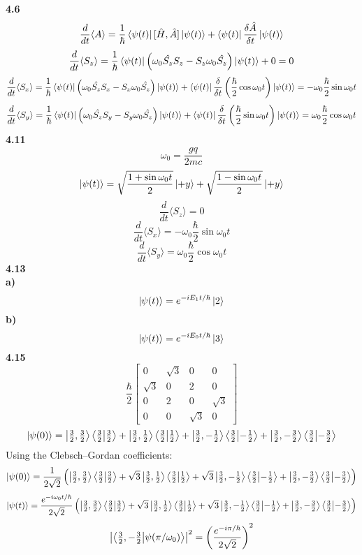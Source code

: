 \documentclass[english]{article}
\begin{document}
\noindent
\textbf{4.6}\\
$$\frac{d}{dt}\langle A\rangle=\frac{1}{\hbar}\bra{\psi(t)}[\hat{H},\hat{A}]\ket{\psi(t)}+\bra{\psi(t)}\frac{\delta\hat{A}}{\delta t}\ket{\psi(t)}$$
$$\frac{d}{dt}\langle S_z\rangle=\frac{1}{\hbar}\bra{\psi(t)}\left(\omega_0\hat{S_z}S_z-S_z\omega_0\hat{S_z}\right)\ket{\psi(t)}+0=0$$
$$\frac{d}{dt}\langle S_x\rangle=\frac{1}{\hbar}\bra{\psi(t)}\left(\omega_0\hat{S_z}S_x-S_x\omega_0\hat{S_z}\right)\ket{\psi(t)}+\bra{\psi(t)}\frac{\delta}{\delta t}\left(\frac{\hbar}{2}\cos\omega_0t\right)\ket{\psi(t)}=-\omega_0\frac{\hbar}{2}\sin\omega_0t$$
$$\frac{d}{dt}\langle S_y\rangle=\frac{1}{\hbar}\bra{\psi(t)}\left(\omega_0\hat{S_z}S_y-S_y\omega_0\hat{S_z}\right)\ket{\psi(t)}+\bra{\psi(t)}\frac{\delta}{\delta t}\left(\frac{\hbar}{2}\sin\omega_0t\right)\ket{\psi(t)}=\omega_0\frac{\hbar}{2}\cos\omega_0t$$
\noindent
\textbf{4.11}\\
$$\omega_0=\frac{gq}{2mc}$$
$$\ket{\psi(t)}=\sqrt{\frac{1+\sin\omega_0t}{2}}\ket{+y}+\sqrt{\frac{1-\sin\omega_0t}{2}}\ket{+y}$$
$$\frac{d}{dt}\langle S_z\rangle=0$$
$$\frac{d}{dt}\langle S_x\rangle=-\omega_0\frac{\hbar}{2}\sin\omega_0t$$
$$\frac{d}{dt}\langle S_y\rangle=\omega_0\frac{\hbar}{2}\cos\omega_0t$$
\noindent
\textbf{4.13}\\
\textbf{a)}
$$\ket{\psi(t)}=e^{-iE_1t/\hbar}\ket{2}$$
\textbf{b)}
$$\ket{\psi(t)}=e^{-iE_0t/\hbar}\ket{3}$$
\noindent
\textbf{4.15}\\
\[
\frac{\hbar}{2}
\begin{bmatrix}
0&\sqrt{3}&0&0\\
\sqrt{3}&0&2&0\\
0&2&0&\sqrt{3}\\
0&0&\sqrt{3}&0
\end{bmatrix}
\]
$$\ket{\psi(0)}=\ket{\tfrac{3}{2},\tfrac{3}{2}}\bra{\tfrac{3}{2}}\ket{\tfrac{3}{2}}+\ket{\tfrac{3}{2},\tfrac{1}{2}}\bra{\tfrac{3}{2}}\ket{\tfrac{1}{2}}+\ket{\tfrac{3}{2},-\tfrac{1}{2}}\bra{\tfrac{3}{2}}\ket{-\tfrac{1}{2}}+\ket{\tfrac{3}{2},-\tfrac{3}{2}}\bra{\tfrac{3}{2}}\ket{-\tfrac{3}{2}}$$
Using the Clebsch–Gordan coefficients:
$$\ket{\psi(0)}=\frac{1}{2\sqrt{2}}\left(\ket{\tfrac{3}{2},\tfrac{3}{2}}\bra{\tfrac{3}{2}}\ket{\tfrac{3}{2}}+\sqrt{3}\ket{\tfrac{3}{2},\tfrac{1}{2}}\bra{\tfrac{3}{2}}\ket{\tfrac{1}{2}}+\sqrt{3}\ket{\tfrac{3}{2},-\tfrac{1}{2}}\bra{\tfrac{3}{2}}\ket{-\tfrac{1}{2}}+\ket{\tfrac{3}{2},-\tfrac{3}{2}}\bra{\tfrac{3}{2}}\ket{-\tfrac{3}{2}}\right)$$
$$\ket{\psi(t)}=\frac{e^{-i\omega_0t/\hbar}}{2\sqrt{2}}\left(\ket{\tfrac{3}{2},\tfrac{3}{2}}\bra{\tfrac{3}{2}}\ket{\tfrac{3}{2}}+\sqrt{3}\ket{\tfrac{3}{2},\tfrac{1}{2}}\bra{\tfrac{3}{2}}\ket{\tfrac{1}{2}}+\sqrt{3}\ket{\tfrac{3}{2},-\tfrac{1}{2}}\bra{\tfrac{3}{2}}\ket{-\tfrac{1}{2}}+\ket{\tfrac{3}{2},-\tfrac{3}{2}}\bra{\tfrac{3}{2}}\ket{-\tfrac{3}{2}}\right)$$
$$\left|\bra{\tfrac{3}{2},-\tfrac{3}{2}}\ket{\psi(\pi/\omega_0)}\right|^2=\left(\frac{e^{-i\pi/\hbar}}{2\sqrt{2}}\right)^2$$
\end{document}
